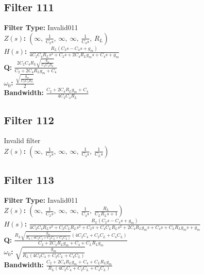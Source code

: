 \documentclass{article}
\begin{document}
\subsection*{Filter 111}
\textbf{Filter Type:} Invalid011 \\ 
\textbf{$Z(s)$:} $\left( \infty, \  \frac{1}{C_{2} s}, \  \infty, \  \infty, \  \frac{1}{C_{4} s}, \  R_{L}\right)$ \\ 
\textbf{$H(s)$:} $\frac{R_{L} \left(C_{2} s - C_{4} s + g_{m}\right)}{4 C_{2} C_{4} R_{L} s^{2} + C_{2} s + 2 C_{4} R_{L} g_{m} s + C_{4} s + g_{m}}$ \\ 
\textbf{Q:} $\frac{2 C_{2} C_{4} R_{L} \sqrt{\frac{g_{m}}{C_{2} C_{4} R_{L}}}}{C_{2} + 2 C_{4} R_{L} g_{m} + C_{4}}$ \\ 
\textbf{$\omega_0$:} $\frac{\sqrt{\frac{g_{m}}{C_{2} C_{4} R_{L}}}}{2}$ \\ 
\textbf{Bandwidth:} $\frac{C_{2} + 2 C_{4} R_{L} g_{m} + C_{4}}{4 C_{2} C_{4} R_{L}}$ \\ 
\subsection*{Filter 112}
Invalid filter \\ 
\textbf{$Z(s)$:} $\left( \infty, \  \frac{1}{C_{2} s}, \  \infty, \  \infty, \  \frac{1}{C_{4} s}, \  \frac{1}{C_{L} s}\right)$ \\ 
\subsection*{Filter 113}
\textbf{Filter Type:} Invalid011 \\ 
\textbf{$Z(s)$:} $\left( \infty, \  \frac{1}{C_{2} s}, \  \infty, \  \infty, \  \frac{1}{C_{4} s}, \  \frac{R_{L}}{C_{L} R_{L} s + 1}\right)$ \\ 
\textbf{$H(s)$:} $\frac{R_{L} \left(C_{2} s - C_{4} s + g_{m}\right)}{4 C_{2} C_{4} R_{L} s^{2} + C_{2} C_{L} R_{L} s^{2} + C_{2} s + C_{4} C_{L} R_{L} s^{2} + 2 C_{4} R_{L} g_{m} s + C_{4} s + C_{L} R_{L} g_{m} s + g_{m}}$ \\ 
\textbf{Q:} $\frac{R_{L} \sqrt{\frac{g_{m}}{R_{L} \left(4 C_{2} C_{4} + C_{2} C_{L} + C_{4} C_{L}\right)}} \left(4 C_{2} C_{4} + C_{2} C_{L} + C_{4} C_{L}\right)}{C_{2} + 2 C_{4} R_{L} g_{m} + C_{4} + C_{L} R_{L} g_{m}}$ \\ 
\textbf{$\omega_0$:} $\sqrt{\frac{g_{m}}{R_{L} \left(4 C_{2} C_{4} + C_{2} C_{L} + C_{4} C_{L}\right)}}$ \\ 
\textbf{Bandwidth:} $\frac{C_{2} + 2 C_{4} R_{L} g_{m} + C_{4} + C_{L} R_{L} g_{m}}{R_{L} \left(4 C_{2} C_{4} + C_{2} C_{L} + C_{4} C_{L}\right)}$ \\ 
\end{document}
